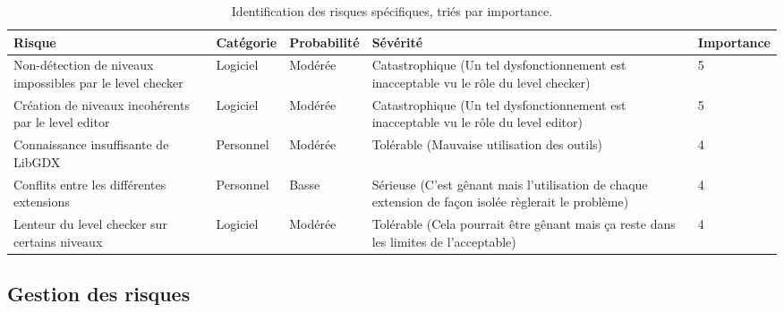 \documentclass[]{article}
\newcommand{\placeholder}[1]{{\noindent \color{red}[ #1 ]}}
\begin{document}
\begin{table}[H]
\begin{center}
\begin{tabular}{|p{3cm}|p{2.5cm}||p{3cm}|p{4cm}|p{1.5cm}|}
\hline
\textbf{Risque} & Catégorie & Probabilité & Sévérité & Importance\\
\hline\hline
Non-détection de niveaux impossibles par le level checker & Logiciel & Modérée &  Catastrophique (Un tel dysfonctionnement est inacceptable vu le rôle du level checker) & 5\\
\hline

Création de niveaux incohérents par le level editor & Logiciel & Modérée &  Catastrophique (Un tel dysfonctionnement est inacceptable vu le rôle du level editor) & 5\\
\hline
Connaissance insuffisante de LibGDX & Personnel & Modérée &  Tolérable (Mauvaise utilisation des outils) & 4\\
\hline

Conflits entre les différentes extensions & Personnel & Basse &  Sérieuse (C'est gênant mais l'utilisation de chaque extension de façon isolée règlerait le problème) & 4\\
\hline
Lenteur du level checker sur certains niveaux & Logiciel & Modérée &  Tolérable (Cela pourrait être gênant mais ça reste dans les limites de l'acceptable) & 4\\
\hline


\end{tabular}
\end{center}
   \caption{Identification des risques spécifiques, triés par importance.}
   \label{tab:risquesgeneriques}
\end{table}


\subsection{Gestion des risques}\label{sec:riskmanagement}
\end{document}
